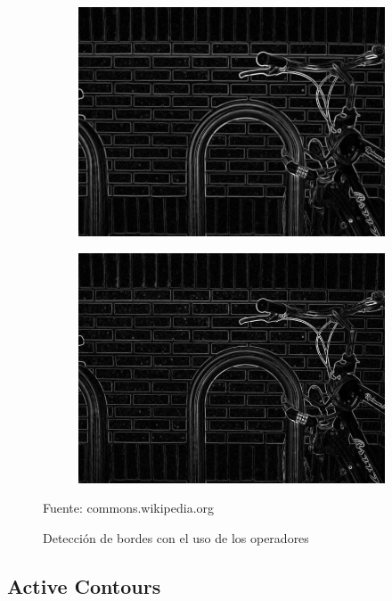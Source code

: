 \begin{figure}[H]
	\begin{subfigure}[t]{2.5in}
		\centering
		\includegraphics[width=.9\textwidth]{./imagenes/operator2}
		\label{operator2}
	\end{subfigure}
	\begin{subfigure}[t]{2.5in}
		\centering
		\includegraphics[width=.9\textwidth]{./imagenes/operator3}
		\label{operator3}
	\end{subfigure}
	\caption{Detecci\'{o}n de bordes con el uso de los operadores}
	\vspace{2 mm}
	\centering
	\label{prewittTable2}
	Fuente: commons.wikipedia.org
\end{figure}

\subsection{Active Contours}\label{cap:actContour}

